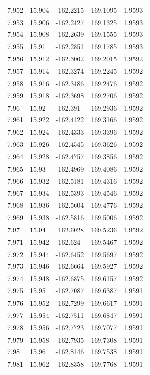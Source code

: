 \begin{tabular}{lllll}
7.952 & 15.904 & -162.2215 & 169.1095 & 1.9593 \\
7.953 & 15.906 & -162.2427 & 169.1325 & 1.9593 \\
7.954 & 15.908 & -162.2639 & 169.1555 & 1.9593 \\
7.955 & 15.91 & -162.2851 & 169.1785 & 1.9593 \\
7.956 & 15.912 & -162.3062 & 169.2015 & 1.9592 \\
7.957 & 15.914 & -162.3274 & 169.2245 & 1.9592 \\
7.958 & 15.916 & -162.3486 & 169.2476 & 1.9592 \\
7.959 & 15.918 & -162.3698 & 169.2706 & 1.9592 \\
7.96 & 15.92 & -162.391 & 169.2936 & 1.9592 \\
7.961 & 15.922 & -162.4122 & 169.3166 & 1.9592 \\
7.962 & 15.924 & -162.4333 & 169.3396 & 1.9592 \\
7.963 & 15.926 & -162.4545 & 169.3626 & 1.9592 \\
7.964 & 15.928 & -162.4757 & 169.3856 & 1.9592 \\
7.965 & 15.93 & -162.4969 & 169.4086 & 1.9592 \\
7.966 & 15.932 & -162.5181 & 169.4316 & 1.9592 \\
7.967 & 15.934 & -162.5393 & 169.4546 & 1.9592 \\
7.968 & 15.936 & -162.5604 & 169.4776 & 1.9592 \\
7.969 & 15.938 & -162.5816 & 169.5006 & 1.9592 \\
7.97 & 15.94 & -162.6028 & 169.5236 & 1.9592 \\
7.971 & 15.942 & -162.624 & 169.5467 & 1.9592 \\
7.972 & 15.944 & -162.6452 & 169.5697 & 1.9592 \\
7.973 & 15.946 & -162.6664 & 169.5927 & 1.9592 \\
7.974 & 15.948 & -162.6875 & 169.6157 & 1.9592 \\
7.975 & 15.95 & -162.7087 & 169.6387 & 1.9591 \\
7.976 & 15.952 & -162.7299 & 169.6617 & 1.9591 \\
7.977 & 15.954 & -162.7511 & 169.6847 & 1.9591 \\
7.978 & 15.956 & -162.7723 & 169.7077 & 1.9591 \\
7.979 & 15.958 & -162.7935 & 169.7308 & 1.9591 \\
7.98 & 15.96 & -162.8146 & 169.7538 & 1.9591 \\
7.981 & 15.962 & -162.8358 & 169.7768 & 1.9591 \\

\end{tabular}
